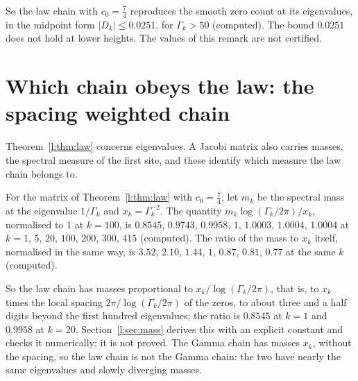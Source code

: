 So the law chain with $c_0=\frac74$ reproduces the smooth zero count at its eigenvalues, in the midpoint form $|D_k|\le0.0251$, for $\Gamma_k>50$ (computed). The bound $0.0251$ does not hold at lower heights. The values of this remark are not certified.

\section{Which chain obeys the law: the spacing weighted chain}\label{l:sec:weighted}

Theorem~\ref{l:thm:law} concerns eigenvalues. A Jacobi matrix also carries masses, the spectral measure of the first site, and these identify which measure the law chain belongs to.

\begin{remark}\label{l:comp:mass}
For the matrix of Theorem~\ref{l:thm:law} with $c_0=\frac74$, let $m_k$ be the spectral mass at the eigenvalue $1/\Gamma_k$ and $x_k=\Gamma_k^{-2}$. The quantity $m_k\log(\Gamma_k/2\pi)/x_k$, normalised to $1$ at $k=100$, is $0.8545$, $0.9743$, $0.9958$, $1$, $1.0003$, $1.0004$, $1.0004$ at $k=1$, $5$, $20$, $100$, $200$, $300$, $415$ (computed). The ratio of the mass to $x_k$ itself, normalised in the same way, is $3.52$, $2.10$, $1.44$, $1$, $0.87$, $0.81$, $0.77$ at the same $k$ (computed).
\end{remark}

So the law chain has masses proportional to $x_k/\log(\Gamma_k/2\pi)$, that is, to $x_k$ times the local spacing $2\pi/\log(\Gamma_k/2\pi)$ of the zeros, to about three and a half digits beyond the first hundred eigenvalues; the ratio is $0.8545$ at $k=1$ and $0.9958$ at $k=20$. Section~\ref{l:sec:mass} derives this with an explicit constant and checks it numerically; it is not proved. The Gamma chain has masses $x_k$, without the spacing, so the law chain is not the Gamma chain: the two have nearly the same eigenvalues and slowly diverging masses.

